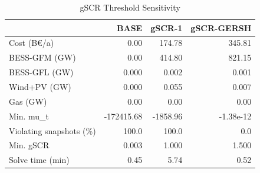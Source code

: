 \begin{table}[!t]
\centering
\caption{gSCR Threshold Sensitivity}
\label{tab:gscr_sensitivity}
\renewcommand{\arraystretch}{1.08}
\begin{tabular}{lrrr}
\toprule
 & BASE & gSCR-1 & gSCR-GERSH \\
\midrule
Cost (B€/a) & 0.00 & 174.78 & 345.81 \\
BESS-GFM (GW) & 0.00 & 414.80 & 821.15 \\
BESS-GFL (GW) & 0.000 & 0.002 & 0.001 \\
Wind+PV (GW) & 0.000 & 0.055 & 0.007 \\
Gas (GW) & 0.00 & 0.00 & 0.00 \\
Min. mu\_t & -172415.68 & -1858.96 & -1.38e-12 \\
Violating snapshots (\%) & 100.0 & 100.0 & 0.0 \\
Min. gSCR & 0.003 & 1.000 & 1.500 \\
Solve time (min) & 0.45 & 5.74 & 0.52 \\
\bottomrule
\end{tabular}
\end{table}
